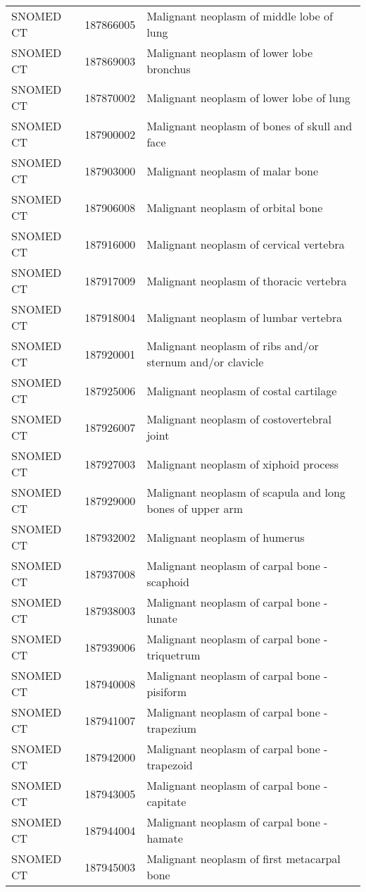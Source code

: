\begin{longtable}{p{}p{}p{}}
  SNOMED CT & 187866005 & Malignant neoplasm of middle lobe of lung \\ 
  SNOMED CT & 187869003 & Malignant neoplasm of lower lobe bronchus \\ 
  SNOMED CT & 187870002 & Malignant neoplasm of lower lobe of lung \\ 
  SNOMED CT & 187900002 & Malignant neoplasm of bones of skull and face \\ 
  SNOMED CT & 187903000 & Malignant neoplasm of malar bone \\ 
  SNOMED CT & 187906008 & Malignant neoplasm of orbital bone \\ 
  SNOMED CT & 187916000 & Malignant neoplasm of cervical vertebra \\ 
  SNOMED CT & 187917009 & Malignant neoplasm of thoracic vertebra \\ 
  SNOMED CT & 187918004 & Malignant neoplasm of lumbar vertebra \\ 
  SNOMED CT & 187920001 & Malignant neoplasm of ribs and/or sternum and/or clavicle \\ 
  SNOMED CT & 187925006 & Malignant neoplasm of costal cartilage \\ 
  SNOMED CT & 187926007 & Malignant neoplasm of costovertebral joint \\ 
  SNOMED CT & 187927003 & Malignant neoplasm of xiphoid process \\ 
  SNOMED CT & 187929000 & Malignant neoplasm of scapula and long bones of upper arm \\ 
  SNOMED CT & 187932002 & Malignant neoplasm of humerus \\ 
  SNOMED CT & 187937008 & Malignant neoplasm of carpal bone - scaphoid \\ 
  SNOMED CT & 187938003 & Malignant neoplasm of carpal bone - lunate \\ 
  SNOMED CT & 187939006 & Malignant neoplasm of carpal bone - triquetrum \\ 
  SNOMED CT & 187940008 & Malignant neoplasm of carpal bone - pisiform \\ 
  SNOMED CT & 187941007 & Malignant neoplasm of carpal bone - trapezium \\ 
  SNOMED CT & 187942000 & Malignant neoplasm of carpal bone - trapezoid \\ 
  SNOMED CT & 187943005 & Malignant neoplasm of carpal bone - capitate \\ 
  SNOMED CT & 187944004 & Malignant neoplasm of carpal bone - hamate \\ 
  SNOMED CT & 187945003 & Malignant neoplasm of first metacarpal bone \\ 

\end{longtable}

